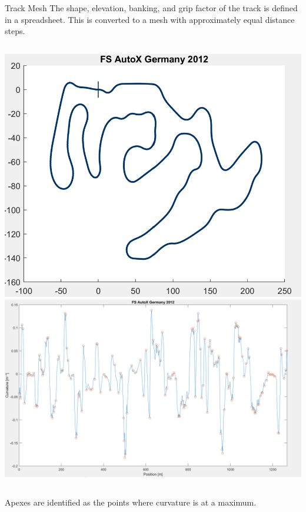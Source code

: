 \begin{frame}{Track Mesh}
    The shape, elevation, banking, and grip factor of the track
    is defined in a spreadsheet.
    This is converted to a mesh with approximately equal distance steps.
    \begin{columns}
        \includegraphics[width=\textwidth]{res/Track Diagram.png} \\
        \includegraphics[width=\textwidth]{res/Mesh Curvature.png}
    \end{columns}
    Apexes are identified as the points where curvature is at a maximum.
\end{frame}

